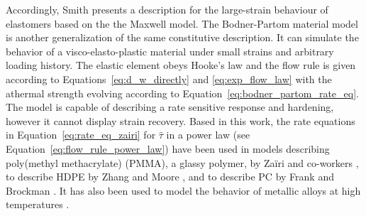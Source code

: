 Accordingly, Smith \citep{smithNonlinearViscoelasticResponse1962} presents a description for the large-strain
behaviour of elastomers based on the the Maxwell model.
The Bodner-Partom material model \citep{bodnerConstitutiveEquationsElasticViscoplastic1975} is another generalization of the same constitutive description.
It can simulate the behavior of a visco-elasto-plastic material under small strains and arbitrary loading history.
The elastic element obeys Hooke's law and the flow rule is given according to Equations~\eqref{eq:d_w_directly} and \eqref{eq:exp_flow_law} with the athermal strength evolving according to Equation~\eqref{eq:bodner_partom_rate_eq}.
The model is capable of describing a rate sensitive response and hardening, however it cannot display strain recovery.
Based in this work, the rate equations in Equation~\eqref{eq:rate_eq_zairi} for $\hat \tau$ in a power law (see Equation~\eqref{eq:flow_rule_power_law}) have been used in models describing poly(methyl methacrylate) (PMMA), a glassy polymer, by Zaïri and co-workers \citep{zairiPhenomenologicalNonlinearModelling2005, zairiElastoviscoplasticConstitutiveEquations2007,zairiModellingElastoviscoplasticDamage2008}, to describe HDPE by Zhang and Moore \citep{zhangNonlinearMechanicalResponse1997}, and to describe PC by Frank and Brockman \citep{frankViscoelasticViscoplasticConstitutive2001}.
It has also been used to model the behavior of metallic alloys at high temperatures \citep{desouzanetoComputationalMethodsPlasticity2008}.

